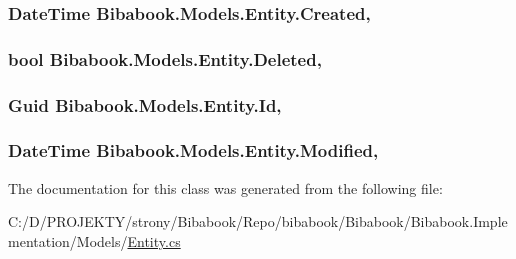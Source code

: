 \subsubsection[{Created}]{\setlength{\rightskip}{0pt plus 5cm}Date\+Time Bibabook.\+Models.\+Entity.\+Created\hspace{0.3cm}{\ttfamily [get]}, {\ttfamily [set]}}\label{class_bibabook_1_1_models_1_1_entity_abea30a106ad1003bad9df21a6674093e}
\hypertarget{class_bibabook_1_1_models_1_1_entity_aa5b970ead38368d5b0cd46700b2a77ad}{}
\subsubsection[{Deleted}]{\setlength{\rightskip}{0pt plus 5cm}bool Bibabook.\+Models.\+Entity.\+Deleted\hspace{0.3cm}{\ttfamily [get]}, {\ttfamily [set]}}\label{class_bibabook_1_1_models_1_1_entity_aa5b970ead38368d5b0cd46700b2a77ad}
\hypertarget{class_bibabook_1_1_models_1_1_entity_a431fd045d34487ff77224ea30e5ba4e7}{}
\subsubsection[{Id}]{\setlength{\rightskip}{0pt plus 5cm}Guid Bibabook.\+Models.\+Entity.\+Id\hspace{0.3cm}{\ttfamily [get]}, {\ttfamily [set]}}\label{class_bibabook_1_1_models_1_1_entity_a431fd045d34487ff77224ea30e5ba4e7}
\hypertarget{class_bibabook_1_1_models_1_1_entity_adf16912ed39bba32d2b2afff50bb0aec}{}
\subsubsection[{Modified}]{\setlength{\rightskip}{0pt plus 5cm}Date\+Time Bibabook.\+Models.\+Entity.\+Modified\hspace{0.3cm}{\ttfamily [get]}, {\ttfamily [set]}}\label{class_bibabook_1_1_models_1_1_entity_adf16912ed39bba32d2b2afff50bb0aec}


The documentation for this class was generated from the following file\+:\begin{DoxyCompactItemize}
\item 
C\+:/\+D/\+P\+R\+O\+J\+E\+K\+T\+Y/strony/\+Bibabook/\+Repo/bibabook/\+Bibabook/\+Bibabook.\+Implementation/\+Models/\hyperlink{_entity_8cs}{Entity.\+cs}\end{DoxyCompactItemize}
